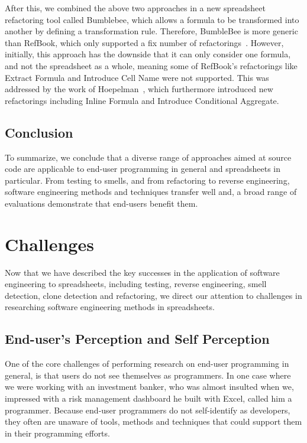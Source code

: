 \documentclass[conference]{IEEEtran}
\begin{document}
After this, we combined the above two approaches in a new spreadsheet refactoring tool called Bumblebee, which allows a formula to be transformed into another by defining a transformation rule. Therefore, BumbleBee is more generic than RefBook, which only supported a fix number of refactorings~\cite{hermans_bumblebee:_2014}. However, initially, this approach has the downside that it can only consider one formula, and not the spreadsheet as a whole, meaning some of RefBook's refactorings like Extract Formula and Introduce Cell Name were not supported. This was addressed by the work of Hoepelman~\cite{hoepelman_thesis_2015}, which furthermore introduced new refactorings including Inline Formula and Introduce Conditional Aggregate.

\subsection{Conclusion}
To summarize, we conclude that a diverse range of approaches aimed at source code are applicable to end-user programming in general and spreadsheets in particular. From testing to smells, and from refactoring to reverse engineering, software engineering methods and techniques transfer well and, a broad range of evaluations demonstrate that end-users benefit them.


\section{Challenges} 
Now that we have described the key successes in the application of software engineering to spreadsheets, including testing, reverse engineering, smell detection, clone detection and refactoring, we direct our attention to challenges in researching software engineering methods in spreadsheets. 

\subsection{End-user's Perception and Self Perception}
One of the core challenges of performing research on end-user programming in general, is that users do not see themselves as programmers. In one case where we were working with an investment banker, who was almost insulted when we, impressed with a risk management dashboard he built with Excel, called him a programmer. Because end-user programmers do not self-identify as developers, they often are unaware of tools, methods and techniques that could support them in their programming efforts.
\end{document}
